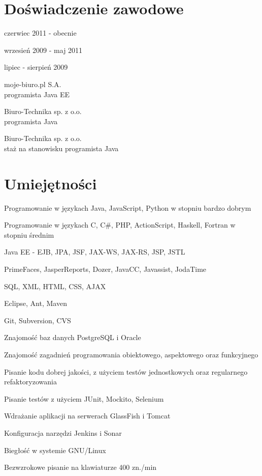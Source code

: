 \documentclass[letterpaper]{article}
\renewenvironment{itemize}{
  \begin{list}{}{
    \setlength{\leftmargin}{1.5em}
  }
}{
  \end{list}
}
\begin{document}
\section*{Doświadczenie zawodowe}

\begin{minipage}{0.30\linewidth}
  \begin{itemize}
    \item czerwiec 2011 - obecnie\\
    \item wrzesień 2009 - maj 2011\\
    \item lipiec - sierpień 2009\\
  \end{itemize}
\end{minipage}
\begin{minipage}{0.70\linewidth}
  \begin{itemize}
    \item moje-biuro.pl S.A.\\
      programista Java EE
    \item Biuro-Technika sp. z o.o.\\
      programista Java
    \item Biuro-Technika sp. z o.o.\\
      staż na stanowisku programista Java
  \end{itemize}
\end{minipage}


\section*{Umiejętności}

\begin{itemize}
\item Programowanie w językach Java, JavaScript, Python w stopniu bardzo dobrym
\item Programowanie w językach C, C\#, PHP, ActionScript, Haskell, Fortran w stopniu średnim
\item Java EE - EJB, JPA, JSF, JAX-WS, JAX-RS, JSP, JSTL
\item PrimeFaces, JasperReports, Dozer, JavaCC, Javassist, JodaTime
\item SQL, XML, HTML, CSS, AJAX
\item Eclipse, Ant, Maven
\item Git, Subversion, CVS
\item Znajomość baz danych PostgreSQL i Oracle
\item Znajomość zagadnień programowania obiektowego, aspektowego oraz funkcyjnego
\item Pisanie kodu dobrej jakości, z użyciem testów jednostkowych oraz regularnego refaktoryzowania
\item Pisanie testów z użyciem JUnit, Mockito, Selenium
\item Wdrażanie aplikacji na serwerach GlassFish i Tomcat
\item Konfiguracja narzędzi Jenkins i Sonar
\item Biegłość w systemie GNU/Linux
\item Bezwzrokowe pisanie na klawiaturze 400 zn./min
\end{itemize}
\end{document}
